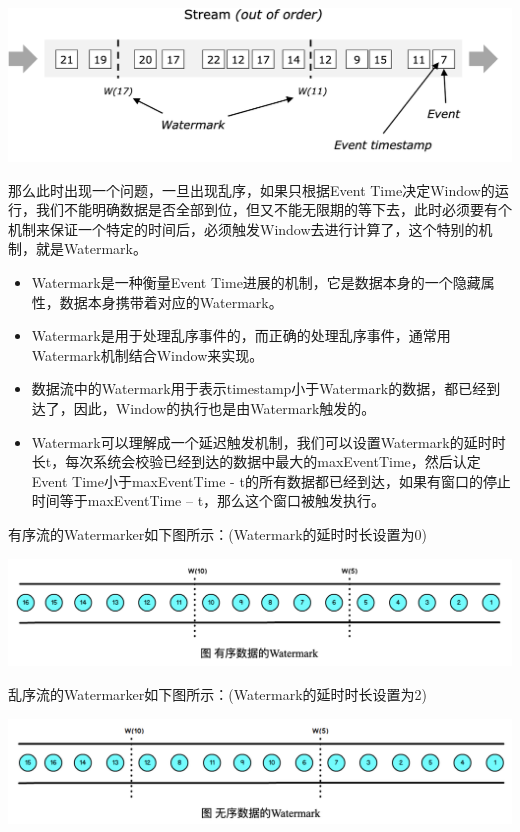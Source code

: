 \documentclass[oneside]{ctexbook}
\begin{document}
\noindent \includegraphics[width=\textwidth]{stream_watermark_out_of_order.png}

那么此时出现一个问题，一旦出现乱序，如果只根据Event Time决定Window的运行，我们不能明确数据是否全部到位，但又不能无限期的等下去，此时必须要有个机制来保证一个特定的时间后，必须触发Window去进行计算了，这个特别的机制，就是Watermark。

\begin{itemize}
\item Watermark是一种衡量Event Time进展的机制，它是数据本身的一个隐藏属性，数据本身携带着对应的Watermark。
\item Watermark是用于处理乱序事件的，而正确的处理乱序事件，通常用Watermark机制结合Window来实现。
\item 数据流中的Watermark用于表示timestamp小于Watermark的数据，都已经到达了，因此，Window的执行也是由Watermark触发的。
\item Watermark可以理解成一个延迟触发机制，我们可以设置Watermark的延时时长t，每次系统会校验已经到达的数据中最大的maxEventTime，然后认定Event Time小于maxEventTime - t的所有数据都已经到达，如果有窗口的停止时间等于maxEventTime – t，那么这个窗口被触发执行。
\end{itemize}

有序流的Watermarker如下图所示：(Watermark的延时时长设置为0)

\noindent \includegraphics[width=\textwidth]{inorderdata.png}

乱序流的Watermarker如下图所示：(Watermark的延时时长设置为2)

\noindent \includegraphics[width=\textwidth]{outorderdata.png}
\end{document}
